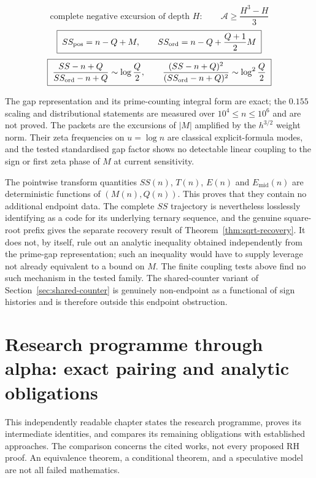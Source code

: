 \documentclass[11pt]{amsart}
\numberwithin{equation}{section}
\theoremstyle{plain}
\theoremstyle{definition}
\theoremstyle{remark}
\begin{document}
\begin{equation}
\label{eq:summary-negative-energy}
\boxed{\;\text{complete negative excursion of depth }H:\qquad
\mathcal A\ge\frac{H^3-H}{3}\;}
\end{equation}
\begin{equation}
\label{eq:summary-nonprime-controls}
\boxed{\;SS_{\rm pos}=n-Q+M,\qquad
SS_{\rm ord}=n-Q+\frac{Q+1}{2}M\;}
\end{equation}
\begin{equation}
\label{eq:summary-prime-amplification}
\boxed{\;\frac{SS-n+Q}{SS_{\rm ord}-n+Q}\sim\log\frac Q2,
\qquad
\frac{(SS-n+Q)^2}{(SS_{\rm ord}-n+Q)^2}\sim\log^2\frac Q2\;}
\end{equation}

The gap representation and its prime-counting integral form are exact; the
$0.155$ scaling and distributional statements are measured over
$10^{4}\le n\le10^{6}$ and are not proved. The packets are the excursions of
$|M|$ amplified by the $h^{3/2}$ weight norm. Their zeta frequencies on
$u=\log n$ are classical explicit-formula modes, and the tested standardised
gap factor shows no detectable linear coupling to the sign or first zeta phase
of $M$ at current sensitivity.

The pointwise transform quantities $SS(n)$, $T(n)$, $E(n)$ and
$E_{\mathrm{mid}}(n)$ are deterministic functions of $(M(n),Q(n))$. This proves
that they contain no additional endpoint data.  The complete $SS$ trajectory is
nevertheless losslessly identifying as a code for its underlying ternary
sequence, and the genuine square-root prefix gives the separate recovery result
of Theorem~\ref{thm:sqrt-recovery}. It does not, by itself, rule out an
analytic inequality obtained independently from the prime-gap representation; such an
inequality would have to supply leverage not already equivalent to a bound on $M$. The
finite coupling tests above find no such mechanism in the tested family. The shared-counter
variant of Section~\ref{sec:shared-counter} is genuinely non-endpoint as a functional
of sign histories and is therefore outside this endpoint obstruction.

\clearpage
\section{Research programme through alpha: exact pairing and analytic obligations}
\label{sec:alpha-programme}

This independently readable chapter states the research programme, proves
its intermediate identities, and compares its remaining obligations with
established approaches. The comparison concerns the cited works, not every
proposed RH proof. An equivalence theorem, a conditional theorem, and a
speculative model are not all failed mathematics.
\end{document}
